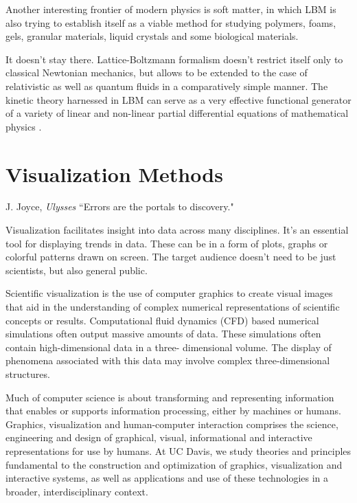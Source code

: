 Another interesting frontier of modern physics is soft matter, in which LBM is also trying to establish itself as a viable method for studying polymers, foams, gels, granular materials, liquid crystals and some biological materials.

It doesn't stay there. Lattice-Boltzmann formalism doesn't restrict itself only to classical Newtonian mechanics, but allows to be extended to the case of relativistic as well as quantum fluids in a comparatively simple manner. The kinetic theory harnessed in LBM can serve as a very effective functional generator of a variety of linear and non-linear partial differential equations of mathematical physics \citep{succi2018}.


\section{Visualization Methods}

\begin{chapquote}{J. Joyce, \textit{Ulysses}}
	``Errors are the portals to discovery."
\end{chapquote}

Visualization facilitates insight into data across many disciplines. It's an essential tool for displaying trends in data. These can be in a form of plots, graphs or colorful patterns drawn on screen. The target audience doesn't need to be just scientists, but also general public. 

Scientific visualization is the use of computer graphics to create visual images that aid in the understanding of complex numerical representations of scientific concepts or results. Computational fluid dynamics (CFD) based numerical simulations often output massive amounts of data. These simulations often contain high-dimensional data in a three- dimensional volume. The display of phenomena associated with this data may involve complex three-dimensional structures.
%

Much of computer science is about transforming and representing information that enables or supports information processing, either by machines or humans. Graphics, visualization and human-computer interaction comprises the science, engineering and design of graphical, visual, informational and interactive representations for use by humans. At UC Davis, we study theories and principles fundamental to the construction and optimization of graphics, visualization and interactive systems, as well as applications and use of these technologies in a broader, interdisciplinary context.
%

